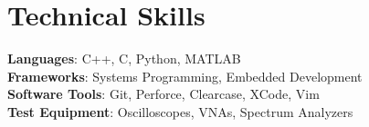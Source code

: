 \documentclass[letterpaper,11pt]{article}
\begin{document}
\section{Technical Skills}
 \begin{itemize}[leftmargin=0.15in, label={}]
    \small{\item{
     \textbf{Languages}{: C++, C, Python, MATLAB} \\
     \textbf{Frameworks}{: Systems Programming, Embedded Development} \\
     \textbf{Software Tools}{: Git, Perforce, Clearcase, XCode, Vim} \\
     \textbf{Test Equipment}{: Oscilloscopes, VNAs, Spectrum Analyzers}
    }}
 \end{itemize}

\end{document}
